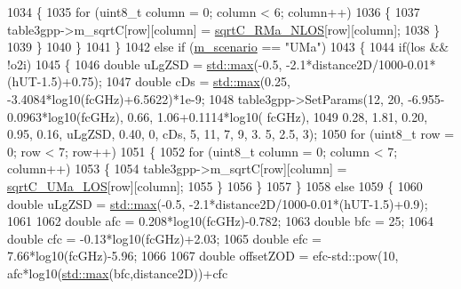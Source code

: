 \begin{DoxyCode}
1034                         \{
1035                                 \textcolor{keywordflow}{for} (uint8\_t column = 0; column < 6; column++)
1036                                 \{
1037                                         table3gpp->m\_sqrtC[row][column] = 
      \hyperlink{namespacens3_a5956658e14c03e840f117722cf0bbbb6}{sqrtC\_RMa\_NLOS}[row][column];
1038                                 \}
1039                         \}
1040                 \}
1041         \}
1042         \textcolor{keywordflow}{else} \textcolor{keywordflow}{if} (\hyperlink{classns3_1_1MmWave3gppChannel_ae1f263fbc87682905d563221343e4447}{m\_scenario} == \textcolor{stringliteral}{"UMa"})
1043         \{
1044                 \textcolor{keywordflow}{if}(los && !o2i)
1045                 \{
1046                         \textcolor{keywordtype}{double} uLgZSD = \hyperlink{80211b_8c_affe776513b24d84b39af8ab0930fef7f}{std::max}(-0.5, -2.1*distance2D/1000-0.01*(hUT-1.5)+0.75);
1047                         \textcolor{keywordtype}{double} cDs = \hyperlink{80211b_8c_affe776513b24d84b39af8ab0930fef7f}{std::max}(0.25, -3.4084*log10(fcGHz)+6.5622)*1e-9;
1048                         table3gpp->SetParams(12, 20, -6.955-0.0963*log10(fcGHz), 0.66, 1.06+0.1114*log10(
      fcGHz),
1049                                         0.28, 1.81, 0.20, 0.95, 0.16, uLgZSD, 0.40, 0, cDs, 5, 11, 7, 9, 3.
      5, 2.5, 3);
1050                         \textcolor{keywordflow}{for} (uint8\_t row = 0; row < 7; row++)
1051                         \{
1052                                 \textcolor{keywordflow}{for} (uint8\_t column = 0; column < 7; column++)
1053                                 \{
1054                                         table3gpp->m\_sqrtC[row][column] = 
      \hyperlink{namespacens3_a6f06e6813ea09282bd2323f4499220b5}{sqrtC\_UMa\_LOS}[row][column];
1055                                 \}
1056                         \}
1057                 \}
1058                 \textcolor{keywordflow}{else}
1059                 \{
1060                         \textcolor{keywordtype}{double} uLgZSD = \hyperlink{80211b_8c_affe776513b24d84b39af8ab0930fef7f}{std::max}(-0.5, -2.1*distance2D/1000-0.01*(hUT-1.5)+0.9);
1061 
1062                         \textcolor{keywordtype}{double} afc = 0.208*log10(fcGHz)-0.782;
1063                         \textcolor{keywordtype}{double} bfc = 25;
1064                         \textcolor{keywordtype}{double} cfc = -0.13*log10(fcGHz)+2.03;
1065                         \textcolor{keywordtype}{double} efc = 7.66*log10(fcGHz)-5.96;
1066 
1067                         \textcolor{keywordtype}{double} offsetZOD = efc-std::pow(10, afc*log10(\hyperlink{80211b_8c_affe776513b24d84b39af8ab0930fef7f}{std::max}(bfc,distance2D))+cfc

\end{DoxyCode}
